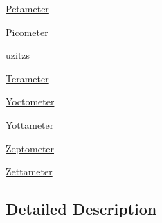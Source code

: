 \begin{DoxyCompactItemize}
\mbox{\hyperlink{group___e_g_x_math-_conversions-_length_conversions-_petameter}{Petameter}}
\item 
\mbox{\hyperlink{group___e_g_x_math-_conversions-_length_conversions-_picometer}{Picometer}}
\item 
\mbox{\hyperlink{group___e_g_x_math-_conversions-_length_conversions-uzitzs}{uzitzs}}
\item 
\mbox{\hyperlink{group___e_g_x_math-_conversions-_length_conversions-_terameter}{Terameter}}
\item 
\mbox{\hyperlink{group___e_g_x_math-_conversions-_length_conversions-_yoctometer}{Yoctometer}}
\item 
\mbox{\hyperlink{group___e_g_x_math-_conversions-_length_conversions-_yottameter}{Yottameter}}
\item 
\mbox{\hyperlink{group___e_g_x_math-_conversions-_length_conversions-_zeptometer}{Zeptometer}}
\item 
\mbox{\hyperlink{group___e_g_x_math-_conversions-_length_conversions-_zettameter}{Zettameter}}
\end{DoxyCompactItemize}


\subsection{Detailed Description}
